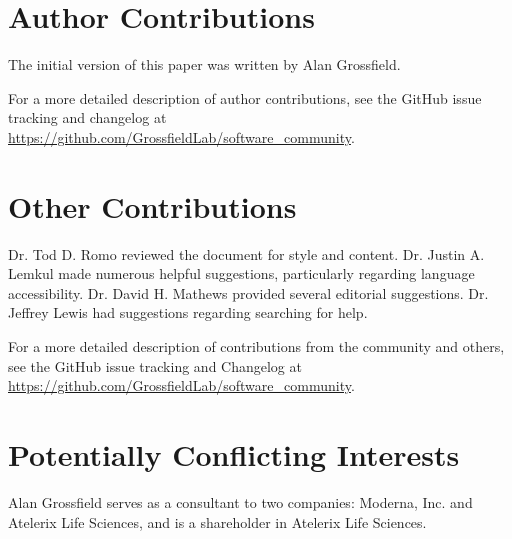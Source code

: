 \documentclass[9pt,training]{livecoms}
\newcommand{\githubrepository}{\url{https://github.com/GrossfieldLab/software_community}}
\begin{document}
\section{Author Contributions}
%
The initial version of this paper was written by Alan Grossfield.


For a more detailed description of author contributions,
see the GitHub issue tracking and changelog at \githubrepository.

\section{Other Contributions}
%
Dr. Tod D. Romo reviewed the document for style and content. Dr. Justin A.
Lemkul made numerous helpful suggestions, particularly regarding language
accessibility. Dr. David H. Mathews provided several editorial suggestions. Dr.
Jeffrey Lewis had suggestions regarding searching for help.

For a more detailed description of contributions from the community and others, see the GitHub issue tracking and Changelog at \githubrepository.

\section{Potentially Conflicting Interests}

Alan Grossfield serves as a consultant to two companies: Moderna, Inc.
and Atelerix Life Sciences, and is a shareholder in Atelerix Life Sciences.
\end{document}
